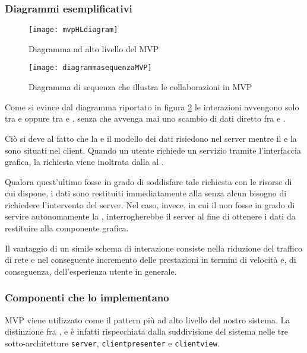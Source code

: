 \subsubsection{Diagrammi esemplificativi}
\begin{figure}[H]
\centering
\texttt{[image: mvpHLdiagram]}
\caption{Diagramma ad alto livello del  MVP}\label{fig:mvpHL}
\end{figure}

\begin{figure}[H]
\centering
\texttt{[image: diagrammasequenzaMVP]}
\caption{Diagramma di sequenza che illustra le collaborazioni in MVP}\label{fig:mvpSD}
\end{figure}

Come si evince dal diagramma riportato in figura \ref{fig:mvpSD} le interazioni avvengono solo tra  e  oppure tra  e , senza che avvenga mai uno scambio di dati diretto fra  e .

Ciò si deve al fatto che la  e il modello dei dati risiedono nel server mentre il  e la  sono situati nel client. Quando un utente richiede un servizio tramite l'interfaccia grafica, la richiesta viene inoltrata dalla  al .

Qualora quest'ultimo fosse in grado di soddisfare tale richiesta con le risorse di cui dispone, i dati sono restituiti immediatamente alla  senza alcun bisogno di richiedere l'intervento del server. Nel caso, invece, in cui il  non fosse in grado di servire autonomamente la , interrogherebbe il server al fine di ottenere i dati da restituire alla componente grafica.

Il vantaggio di un simile schema di interazione consiste nella riduzione del traffico di rete e nel conseguente incremento delle prestazioni in termini di velocità e, di conseguenza, dell'esperienza utente in generale.

\subsubsection{Componenti che lo implementano}
MVP viene utilizzato come il pattern più ad alto livello del nostro sistema. La distinzione fra ,  e  è infatti rispecchiata dalla suddivisione del sistema nelle tre sotto-architetture \texttt{server}, \texttt{clientpresenter} e \texttt{clientview}.

